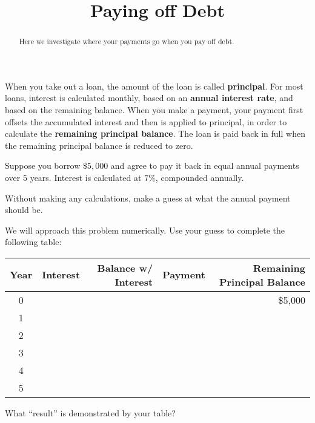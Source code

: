 \documentclass[,nooutcomes]{ximera}
\title{Paying off Debt}
\begin{document}
\begin{abstract}
Here we investigate where your payments go when you pay off debt.
\end{abstract}
\maketitle

When you take out a loan, the amount of the loan is called
\textbf{principal}.  For most loans, interest is calculated monthly,
based on an \textbf{annual interest rate}, and based on the remaining
balance.  When you make a payment, your payment first offsets the
accumulated interest and then is applied to principal, in order to
calculate the \textbf{remaining principal balance}.  The loan is paid
back in full when the remaining principal balance is reduced to zero.
\begin{question}
Suppose you borrow $\$5,000$ and agree to pay it back in equal annual
payments over $5$ years.  Interest is calculated at $7\%$,
compounded annually. 

Without making any calculations, make a guess at what the annual payment should be.  
\end{question}

\begin{question}
We will approach this problem numerically.  Use your guess to complete the following table:  

\begin{table}[h]
\begin{tabular}{|c|r|r|r|r|}
\hline
Year & Interest & Balance w/ Interest & Payment & Remaining Principal Balance \\ \hline
0    &          &                     &         & \$5,000                     \\ \hline
1    &          &                     &         &                             \\ \hline
2    &          &                     &         &                             \\ \hline
3    &          &                     &         &                             \\ \hline
4    &          &                     &         &                             \\ \hline
5    &          &                     &         &                             \\ \hline
\end{tabular}
\end{table}
What ``result'' is demonstrated by your table?  
\begin{freeResponse}
\end{freeResponse}
\end{question}
\end{document}

